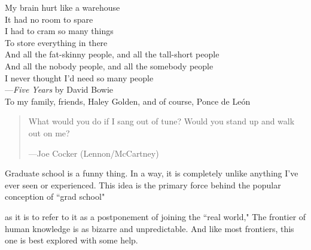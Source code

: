 \documentclass{ucbthesis}
\begin{document}
\begin{frontmatter}

\begin{dedication}
\begin{center}
\vfil\null
My brain hurt like a warehouse\\
It had no room to spare\\
I had to cram so many things\\
To store everything in there\\
And all the fat-skinny people, and all the tall-short people\\
And all the nobody people, and all the somebody people\\
I never thought I'd need so many people\\
\vspace{5 mm}
---\textit{Five Years} by David Bowie\\
\vspace{30 mm}
To my family, friends, Haley Golden, and of course, Ponce de Le\'on\\
\end{center}
\end{dedication}

\tableofcontents

\begin{acknowledgements}

\begin{quotation}
What would you do if I sang out of tune? Would you stand up and walk out on me?
\begin{flushright}
 ---Joe Cocker (Lennon/McCartney)
\end{flushright}
\end{quotation}


Graduate school is a funny thing. In a way, it is completely unlike anything I've ever seen or experienced. This idea is the primary force behind the popular conception of ``grad school"

as it is to refer to it as a postponement of joining the ``real world," The frontier of human knowledge is as bizarre and unpredictable. And like most frontiers, this one is best explored with some help.

\end{acknowledgements}

\end{frontmatter}

\pagestyle{headings}







\printbibliography
\end{document}
